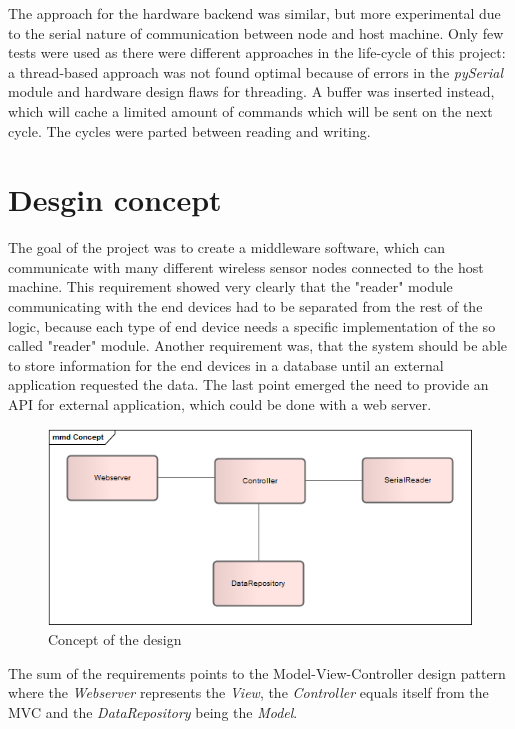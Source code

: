 The approach for the hardware backend was similar, but more experimental due to the serial nature of communication between node and host machine. Only
few tests were used as there were different approaches in the life-cycle of this project: a thread-based approach was not found optimal because 
of errors in the \textit{pySerial} module and hardware design flaws for threading. A buffer was inserted instead, which will cache a limited amount of commands which
will be sent on the next cycle. The cycles were parted between reading and writing.

\section{Desgin concept}
The goal of the project was to create a middleware software, which can communicate with many different wireless sensor nodes connected to the host machine. This requirement showed very clearly that the "reader" module communicating with the end devices had to be separated from the rest of the logic, because each type of end device needs a specific implementation of the so called "reader" module. Another requirement was, that the system should be able to store information for the end devices in a database until an external application requested the data. The last point emerged the need to provide an API for external application, which could be done with a web server.


\begin{figure}[H]
	\centering
	\includegraphics[width=1.0\textwidth]{pic/Concept.png}%
    \caption{Concept of the design}
    \label{Conceptpic}%
\end{figure}

The sum of the requirements points to the Model-View-Controller design pattern where the \textit{Webserver} represents the \textit{View}, the \textit{Controller} equals itself from the MVC and the \textit{DataRepository} being the \textit{Model}.


